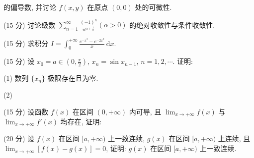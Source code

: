 的偏导数, 并讨论 $f(x,y)$ 在原点 $(0,0)$ 处的可微性.\par
\par{}
(15 分) 讨论级数 $\sum_{n=1}^{\infty} \frac{(-1)^n}{n^{\alpha + \frac{1}{n}}} (\alpha > 0)$ 的绝对收敛性与条件收敛性.\par
\par{}
(15 分) 求积分 $I = \int_{0}^{+\infty} \frac{e^{-x^2} - e^{-2x^2}}{x} \, \mathrm{d}x$.\par
\par{}
(15 分) 设 $x_0 = a \in \left(0, \frac{\pi}{2}\right)$, $x_n = \sin x_{n-1}$, $n = 1, 2, \cdots$. 证明:\par
(1) 数列  $\{x_{n}\}$  极限存在且为零.\par
(2) \par
\par{}
\par{}
(15 分) 设函数 $f(x)$ 在区间 $(0, +\infty)$ 内可导, 且 $\lim_{x \to +\infty} f(x)$ 与 $\lim_{x \to +\infty} f'(x)$ 均存在, 证明:\par
\nopagebreak[4]
\par{}
(20 分) 设 $f(x)$ 在区间 $[a, +\infty)$ 上一致连续, $g(x)$ 在区间 $[a, +\infty)$ 上连续, 且 $\lim_{x \to +\infty} [f(x) - g(x)] = 0$, 证明: $g(x)$ 在区间 $[a, +\infty)$ 上一致连续.\par
